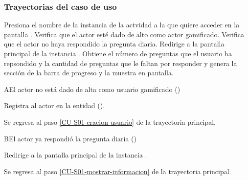 \subsubsection{Trayectorias del caso de uso}

\begin{UCtrayectoria}%
%
 	\Actor Presiona el nombre de la instancia de la actvidad a la que quiere acceder en la pantalla .
    \Sistema Verifica que el actor esté dado de alto como actor gamificado. 
    \label{CU-S01-cracion-usuario}
	\Sistema Verifica que el actor no haya respondido la pregunta diaria. 
    \Sistema Redirige a la pantalla principal de la instancia .
	\Sistema Obtiene el número de preguntas que el usuario ha repsondido
    \label{CU-S01-mostrar-informacion}
	y la cantidad de preguntas que le faltan por responder y genera la sección de la barra de progreso y la muestra en pantalla. 

\end{UCtrayectoria}

\begin{UCtrayectoriaA}{A}{El actor no está dado de alta como usuario gamificado ()}

  \Sistema Registra al actor en la entidad ().
    \item Se regresa al paso \ref{CU-S01-cracion-usuario} de la trayectoria principal.


\end{UCtrayectoriaA}


\begin{UCtrayectoriaA}{B}{El actor ya respondió la pregunta diaria ()}

    \Sistema Redirige a la pantalla principal de la instancia .
    \item Se regresa al paso \ref{CU-S01-mostrar-informacion} de la trayectoria principal.


\end{UCtrayectoriaA}




